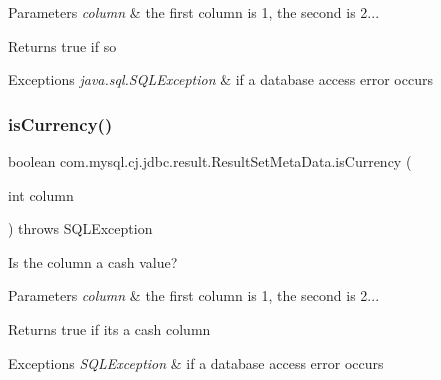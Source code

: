 \begin{DoxyParams}{Parameters}
{\em column} & the first column is 1, the second is 2...\\
\hline
\end{DoxyParams}
\begin{DoxyReturn}{Returns}
true if so
\end{DoxyReturn}

\begin{DoxyExceptions}{Exceptions}
{\em java.\+sql.\+S\+Q\+L\+Exception} & if a database access error occurs \\
\hline
\end{DoxyExceptions}
\mbox{\label{classcom_1_1mysql_1_1cj_1_1jdbc_1_1result_1_1_result_set_meta_data_ac7a3732650739d19c5fa38abc5c3c174}} 
\subsubsection{\texorpdfstring{is\+Currency()}{isCurrency()}}
{\footnotesize\ttfamily boolean com.\+mysql.\+cj.\+jdbc.\+result.\+Result\+Set\+Meta\+Data.\+is\+Currency (\begin{DoxyParamCaption}\item[{int}]{column }\end{DoxyParamCaption}) throws S\+Q\+L\+Exception}

Is the column a cash value?


\begin{DoxyParams}{Parameters}
{\em column} & the first column is 1, the second is 2...\\
\hline
\end{DoxyParams}
\begin{DoxyReturn}{Returns}
true if its a cash column
\end{DoxyReturn}

\begin{DoxyExceptions}{Exceptions}
{\em S\+Q\+L\+Exception} & if a database access error occurs \\
\hline
\end{DoxyExceptions}
\mbox{\label{classcom_1_1mysql_1_1cj_1_1jdbc_1_1result_1_1_result_set_meta_data_a093b037154dd33aa063eaea7cfde6168}} 
